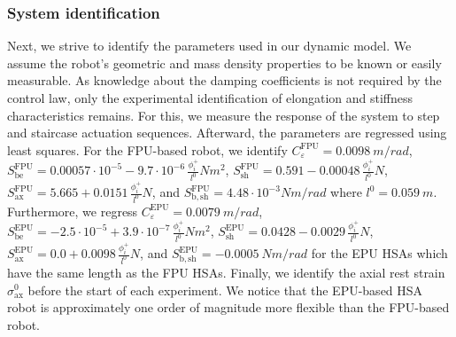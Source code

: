 \subsubsection{System identification}\label{ssub:hsamodel:planar_hsa_robot_model:model_verification:system_identification}
Next, we strive to identify the parameters used in our dynamic model.
We assume the robot's geometric and mass density properties to be known or easily measurable. %
As knowledge about the damping coefficients is not required by the control law, only the experimental identification of elongation and stiffness characteristics remains.
For this, we measure the response of the system to step and staircase actuation sequences. Afterward, the parameters are regressed using least squares. %
For the FPU-based robot, we identify $C_\varepsilon^\mathrm{FPU}=\SI{0.0098}{m \per rad}$, $S_\mathrm{be}^\mathrm{FPU} = 0.00057 \cdot 10^{-5} - 9.7 \cdot 10^{-6} \, \frac{\phi_i^+}{l^0} \si{Nm^2}$, $S_\mathrm{sh}^\mathrm{FPU} = 0.591 - 0.00048 \, \frac{\phi_i^+}{l^0} \si{N}$, $S_\mathrm{ax}^\mathrm{FPU} = 5.665 + 0.0151 \, \frac{\phi_i^+}{l^0} \si{N}$, and $S_\mathrm{b,sh}^\mathrm{FPU} = 4.48 \cdot 10^{-3} \si{Nm \per rad}$ where $l^0 = \SI{0.059}{m}$. 
Furthermore, we regress $C_\varepsilon^\mathrm{EPU}=\SI{0.0079}{m \per rad}$, $S_\mathrm{be}^\mathrm{EPU} = -2.5 \cdot 10^{-5} + 3.9 \cdot 10^{-7} \, \frac{\phi_i^+}{l^0} \si{Nm^2}$, $S_\mathrm{sh}^\mathrm{EPU} = 0.0428 - 0.0029 \, \frac{\phi_i^+}{l^0} \si{N}$, $S_\mathrm{ax}^\mathrm{EPU} = 0.0 + 0.0098 \, \frac{\phi_i^+}{l^0} \si{N}$, and $S_\mathrm{b,sh}^\mathrm{EPU} = -\SI{0.0005}{Nm \per rad}$ for the EPU \glspl{HSA} which have the same length as the FPU \glspl{HSA}.
Finally, we identify the axial rest strain $\sigma_\mathrm{ax}^0$ before the start of each experiment.
We notice that the EPU-based HSA robot is approximately one order of magnitude more flexible than the FPU-based robot.

